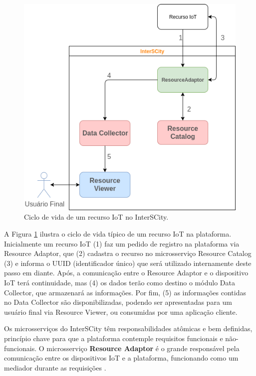 \begin{figure}
  \centering
    \includegraphics[scale=0.5]{figuras/interscity_flow.png}
  \caption{Ciclo de vida de um recurso IoT no InterSCity.}
  \label{fig:interscity-lifecycle}
\end{figure}

A Figura \ref{fig:interscity-lifecycle} ilustra o ciclo de vida típico de um
recurso IoT na plataforma. Inicialmente um recurso IoT (1) faz um pedido de
registro na plataforma via Resource Adaptor, que (2) cadastra o recurso no
microsserviço Resource Catalog (3) e informa o UUID
(identificador único) que será utilizado internamente deste passo em diante.
Após, a comunicação entre o Resource Adaptor e o dispositivo IoT terá
continuidade, mas (4) os dados terão como destino o módulo Data Collector,
que armazenará as informações. Por fim, (5) as informações contidas no
Data Collector são disponibilizadas, podendo ser apresentadas para um usuário
final via Resource Viewer, ou consumidas por uma aplicação cliente.

Os microsserviços do InterSCity têm responsabilidades atômicas e bem
definidas, princípio chave para que a plataforma contemple requisitos funcionais
e não-funcionais. O microsserviço \textbf{Resource Adaptor} é o grande
responsável pela comunicação entre os dispositivos IoT e a plataforma,
funcionando como um mediador durante as requisições \cite{delesposte2017}.

